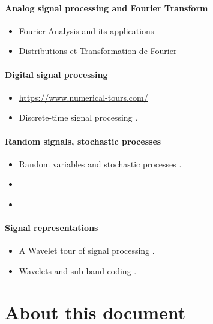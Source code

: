 \paragraph{Analog signal processing and Fourier Transform}

\begin{itemize}
    \item Fourier Analysis and its applications \cite{vretblad2003fourier}
    \item Distributions et Transformation de Fourier \cite{roddier1985distributions}
  \end{itemize}

  \paragraph{Digital signal processing}

  \begin{itemize}
    \item   \url{https://www.numerical-tours.com/}
    
    \item  Discrete-time signal processing \cite{oppenheim1999discrete}.
  \end{itemize}

\paragraph{Random signals, stochastic processes}

\begin{itemize}
    \item Random variables and stochastic processes \cite{papoulis1965random}.
    \item \cite{ross1996stochastic}
    \item \cite{kay1993fundamentals}
\end{itemize}



\paragraph{Signal representations}
\begin{itemize}
    \item A Wavelet tour of signal processing \cite{mallat1999wavelet}.
    \item Wavelets and sub-band coding \cite{vetterli1995wavelets}.
\end{itemize}

\section{About this document}

